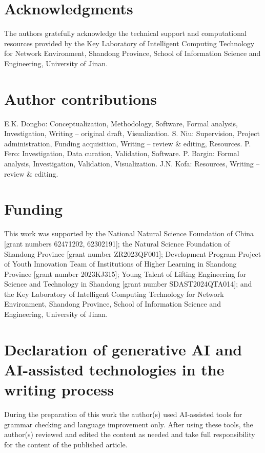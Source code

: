 \documentclass[preprint,12pt]{elsarticle}
\begin{document}
\section*{Acknowledgments}
The authors gratefully acknowledge the technical support and computational resources provided by the Key Laboratory of Intelligent Computing Technology for Network Environment, Shandong Province, School of Information Science and Engineering, University of Jinan.

\section*{Author contributions}
E.K. Dongbo: Conceptualization, Methodology, Software, Formal analysis, Investigation, Writing – original draft, Visualization. S. Niu: Supervision, Project administration, Funding acquisition, Writing – review \& editing, Resources. P. Fero: Investigation, Data curation, Validation, Software. P. Bargin: Formal analysis, Investigation, Validation, Visualization. J.N. Kofa: Resources, Writing – review \& editing.

\section*{Funding}
This work was supported by the National Natural Science Foundation of China [grant numbers 62471202, 62302191]; the Natural Science Foundation of Shandong Province [grant number ZR2023QF001]; Development Program Project of Youth Innovation Team of Institutions of Higher Learning in Shandong Province [grant number 2023KJ315]; Young Talent of Lifting Engineering for Science and Technology in Shandong [grant number SDAST2024QTA014]; and the Key Laboratory of Intelligent Computing Technology for Network Environment, Shandong Province, School of Information Science and Engineering, University of Jinan.

\section*{Declaration of generative AI and AI-assisted technologies in the writing process}
During the preparation of this work the author(s) used AI-assisted tools for grammar checking and language improvement only. After using these tools, the author(s) reviewed and edited the content as needed and take full responsibility for the content of the published article.
\end{document}

